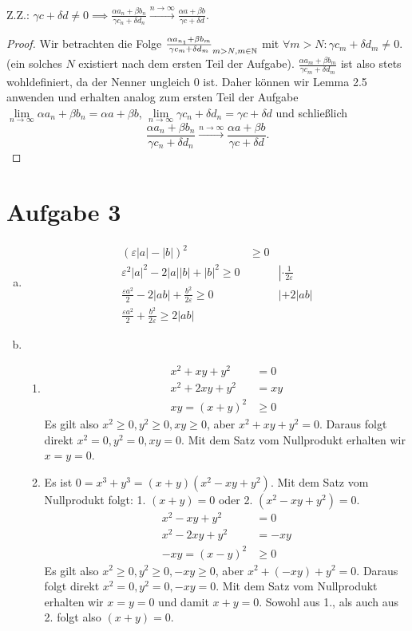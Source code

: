 \documentclass{article}
\newcommand{\mylimes}{\lim\limits_{n\to\infty}}
\begin{document}
Z.Z.: $\gamma c + \delta d \neq 0 \implies \frac{\alpha a_n + \beta b_n}{\gamma c_n + \delta d_n}\overset{n\to \infty}{\to} \frac{\alpha a + \beta b}{\gamma c + \delta d}$.
\begin{proof}
	Wir betrachten die Folge $\frac{\alpha a_{n_1} + \beta b_{m}}{\gamma c_{m} + \delta d_{m}}_{m>N, m\in \mathbb{N}}$ mit $\forall m > N: \gamma c_{m} + \delta d_{m} \neq 0$. (ein solches $N$ existiert nach dem ersten Teil der Aufgabe).
	 $\frac{\alpha a_{m} + \beta b_{m}}{\gamma c_{m} + \delta d_{m}}$ ist also stets wohldefiniert, da der Nenner ungleich 0 ist. 
 	Daher können wir Lemma 2.5 anwenden und erhalten analog zum ersten Teil der Aufgabe $\mylimes \alpha a_n + \beta b_n = \alpha a + \beta b$,  $\mylimes \gamma c_n + \delta d_n = \gamma c + \delta d$ und schließlich $$\frac{\alpha a_n + \beta b_n}{\gamma c_n + \delta d_n}\overset{n\to \infty}{\to} \frac{\alpha a + \beta b}{\gamma c + \delta d}.$$
\end{proof}
	\section*{Aufgabe 3}
	\begin{enumerate}[(a)]
		\item \begin{align*}
			(\varepsilon |a| - |b|)^2 &\geq 0\\
			\varepsilon^2 |a|^2 - 2|a||b| + |b|^2 \geq 0&&\left|\cdot \frac{1}{2\varepsilon}\right.\\
			\frac{\varepsilon a^2}{2} - 2|ab| +\frac{b^2}{2\varepsilon} \geq 0&&\left|+2|ab|\right.\\
			\frac{\varepsilon a^2}{2} +\frac{b^2}{2\varepsilon} \geq 2|ab|
		\end{align*}
		\item \begin{enumerate}
			\item \begin{align*}
				x^2 + xy + y^2 &= 0\\
				x^2 + 2xy + y^2 &= xy\\
				xy = (x + y)^2  &\geq 0
			\end{align*}
			Es gilt also $x^2 \geq 0, y^2 \geq 0, xy \geq 0$, aber $x^2 + xy + y^2 = 0$. Daraus folgt direkt $x^2 = 0, y^2 = 0, xy = 0$. Mit dem Satz vom Nullprodukt erhalten wir $x=y=0$.
			\item Es ist $0 = x^3 + y ^3 = (x+y) (x^2 - xy + y^2)$. Mit dem Satz vom Nullprodukt folgt: 1. $(x+y) = 0$ oder 2. $(x^2 - xy + y^2) = 0$.
			\begin{align*}
				x^2 - xy + y^2 &= 0\\
				x^2 - 2xy + y^2 &= -xy\\
				-xy = (x - y)^2  &\geq 0
			\end{align*}
			Es gilt also $x^2 \geq 0, y^2 \geq 0, -xy \geq 0$, aber $x^2 + (-xy) + y^2 = 0$. Daraus folgt direkt $x^2 = 0, y^2 = 0, -xy = 0$. Mit dem Satz vom Nullprodukt erhalten wir $x=y=0$ und damit $x + y=0$.
			Sowohl aus 1., als auch aus 2. folgt also $(x+y) = 0$.
		\end{enumerate}
	\end{enumerate}
\end{document}
